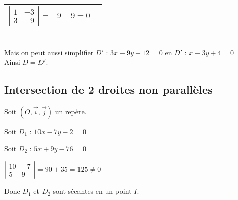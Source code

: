 \begin{tabular}{ll}
$ \left| \begin{array}{cc}
1 & -3 \\
3 & -9  \end{array} \right| = -9 +9 = 0$ \\
\end{tabular} \\

Mais on peut aussi simplifier $D'$ :  $3x -9y + 12 = 0 $ en $D'$ :   $x -3y +4 =0$ \\

Ainsi $D = D'$.

\newpage 

\subsection{Intersection de 2 droites non parallèles}

Soit $(O,\vec{i},\vec{j})$ un repère.

\vspace{.5cm}


Soit $D_{1}$ : $10x -7y -2 = 0 $

Soit $D_{2}$ : $5x +9y -76 = 0 $

\vspace{.5cm}


$\left| \begin{array}{cc}
10 & -7\\
5 & 9    \end{array} \right|= 90 +35 = 125 \neq 0 $

\vspace{.5cm}

Donc $D_{1}$ et $D_{2}$ sont sécantes en un point $I$.

\vspace{.5cm}

